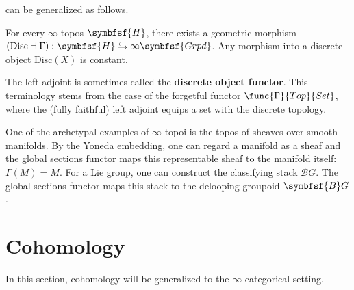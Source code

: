          can be generalized as follows.
        \begin{property}
            For every $\infty$-topos $\symbfsf{H}$, there exists a geometric morphism $(\mathrm{Disc}\dashv\Gamma):\symbfsf{H}\leftrightarrows\infty\symbfsf{Grpd}$. Any morphism into a discrete object $\mathrm{Disc}(X)$ is constant.
    
            The left adjoint is sometimes called the \textbf{discrete object functor}. This terminology stems from the case of the forgetful functor $\func{\Gamma}{Top}{Set}$, where the (fully faithful) left adjoint equips a set with the discrete topology.
        \end{property}
        \begin{example}
            One of the archetypal examples of $\infty$-topoi is the topos of sheaves over smooth manifolds. By the Yoneda embedding, one can regard a manifold as a sheaf and the global sections functor maps this representable sheaf to the manifold itself: $\Gamma(M)=M$. For a Lie group, one can construct the classifying stack $\mathcal{B}G$. The global sections functor maps this stack to the delooping groupoid $\symbfsf{B}G$.
        \end{example}
    
    
    
    \section{Cohomology}
    
        In this section, cohomology will be generalized to the $\infty$-categorical setting.
    
